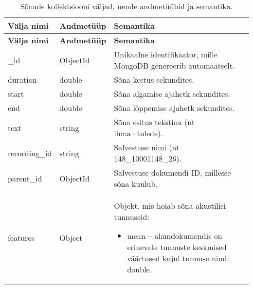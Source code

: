 \begin{longtable}{|p{2.5cm}|p{3cm}|p{8cm}|}
    \caption{Sõnade kollektsiooni väljad, nende andmetüübid ja semantika.}
    \label{tab:words}\\
    \hline
    \textbf{Välja nimi} & \textbf{Andmetüüp} & \textbf{Semantika}\\
    \hline
    \endfirsthead
    \hline
    \textbf{Välja nimi} & \textbf{Andmetüüp} & \textbf{Semantika}\\
    \hline
    \endhead
    \endfoot
    \hline
    \endlastfoot

    \_id &
    ObjectId &
    Unikaalne identifikaator, mille MongoDB genereerib automaatselt.\\ \hline

    duration &
    double &
    Sõna kestus sekundites.\\ \hline

    start &
    double &
    Sõna algamise ajahetk sekundites.\\ \hline

    end &
    double &
    Sõna lõppemise ajahetk sekundites.\\ \hline

    text &
    string &
    Sõna esitus tekstina (nt linna+tulede).\\ \hline

    recording\_id &
    string &
    Salvestuse nimi (nt 148\_10001148\_26).\\ \hline

    parent\_id &
    ObjectId &
    Salvestuse dokumendi ID, millesse sõna kuulub.\\ \hline
    
    features &
    Object &
    Objekt, mis hoiab sõna akustilisi tunnuseid:
    \begin{itemize}
      \item mean – alamdokumendis on erinevate tunnuste keskmised väärtused kujul tunnuse nimi: double.
    \end{itemize}\\ \hline

\end{longtable}


